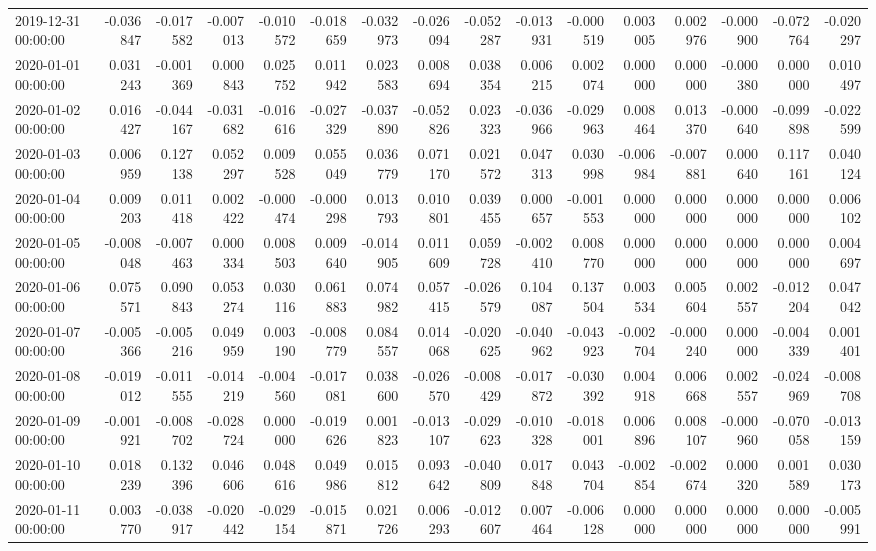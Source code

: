 \begin{tabular}{lrrrrrrrrrrrrrrr}
2019-12-31 00:00:00 & -0.036847 & -0.017582 & -0.007013 & -0.010572 & -0.018659 & -0.032973 & -0.026094 & -0.052287 & -0.013931 & -0.000519 & 0.003005 & 0.002976 & -0.000900 & -0.072764 & -0.020297 \\
2020-01-01 00:00:00 & 0.031243 & -0.001369 & 0.000843 & 0.025752 & 0.011942 & 0.023583 & 0.008694 & 0.038354 & 0.006215 & 0.002074 & 0.000000 & 0.000000 & -0.000380 & 0.000000 & 0.010497 \\
2020-01-02 00:00:00 & 0.016427 & -0.044167 & -0.031682 & -0.016616 & -0.027329 & -0.037890 & -0.052826 & 0.023323 & -0.036966 & -0.029963 & 0.008464 & 0.013370 & -0.000640 & -0.099898 & -0.022599 \\
2020-01-03 00:00:00 & 0.006959 & 0.127138 & 0.052297 & 0.009528 & 0.055049 & 0.036779 & 0.071170 & 0.021572 & 0.047313 & 0.030998 & -0.006984 & -0.007881 & 0.000640 & 0.117161 & 0.040124 \\
2020-01-04 00:00:00 & 0.009203 & 0.011418 & 0.002422 & -0.000474 & -0.000298 & 0.013793 & 0.010801 & 0.039455 & 0.000657 & -0.001553 & 0.000000 & 0.000000 & 0.000000 & 0.000000 & 0.006102 \\
2020-01-05 00:00:00 & -0.008048 & -0.007463 & 0.000334 & 0.008503 & 0.009640 & -0.014905 & 0.011609 & 0.059728 & -0.002410 & 0.008770 & 0.000000 & 0.000000 & 0.000000 & 0.000000 & 0.004697 \\
2020-01-06 00:00:00 & 0.075571 & 0.090843 & 0.053274 & 0.030116 & 0.061883 & 0.074982 & 0.057415 & -0.026579 & 0.104087 & 0.137504 & 0.003534 & 0.005604 & 0.002557 & -0.012204 & 0.047042 \\
2020-01-07 00:00:00 & -0.005366 & -0.005216 & 0.049959 & 0.003190 & -0.008779 & 0.084557 & 0.014068 & -0.020625 & -0.040962 & -0.043923 & -0.002704 & -0.000240 & 0.000000 & -0.004339 & 0.001401 \\
2020-01-08 00:00:00 & -0.019012 & -0.011555 & -0.014219 & -0.004560 & -0.017081 & 0.038600 & -0.026570 & -0.008429 & -0.017872 & -0.030392 & 0.004918 & 0.006668 & 0.002557 & -0.024969 & -0.008708 \\
2020-01-09 00:00:00 & -0.001921 & -0.008702 & -0.028724 & 0.000000 & -0.019626 & 0.001823 & -0.013107 & -0.029623 & -0.010328 & -0.018001 & 0.006896 & 0.008107 & -0.000960 & -0.070058 & -0.013159 \\
2020-01-10 00:00:00 & 0.018239 & 0.132396 & 0.046606 & 0.048616 & 0.049986 & 0.015812 & 0.093642 & -0.040809 & 0.017848 & 0.043704 & -0.002854 & -0.002674 & 0.000320 & 0.001589 & 0.030173 \\
2020-01-11 00:00:00 & 0.003770 & -0.038917 & -0.020442 & -0.029154 & -0.015871 & 0.021726 & 0.006293 & -0.012607 & 0.007464 & -0.006128 & 0.000000 & 0.000000 & 0.000000 & 0.000000 & -0.005991 \\

\end{tabular}
